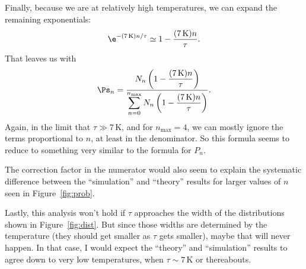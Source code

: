 \documentclass[11pt]{article}
\begin{document}
Finally, because we are at relatively high temperatures, we can expand the remaining exponentials:
\begin{equation}
\e^{-(7\,\text{K})n/\tau}\simeq 1-\frac{(7\,\text{K})n}{\tau}.
\end{equation}
That leaves us with
\begin{equation}
\Ps_n=\frac{\displaystyle N_n\left(1-\frac{(7\,\text{K})n}{\tau}\right)}
	{\displaystyle\sum_{n=0}^{n_\text{max}} N_n\left(1-\frac{(7\,\text{K})n}{\tau}\right)}.
\end{equation}
Again, in the limit that $\tau\gg 7\,\text{K}$, and for $n_\text{max}=4$, we can mostly ignore the terms proportional to $n$, at least in the denominator. So this formula seems to reduce to something very similar to the formula for $P_n$.

The correction factor in the numerator would also seem to explain the systematic difference between the ``simulation'' and ``theory'' results for larger values of $n$ seen in Figure~\ref{fig:prob}.

Lastly, this analysis won't hold if $\tau$ approaches the width of the distributions shown in Figure~\ref{fig:dist}. But since those widths are determined by the temperature (they should get smaller as $\tau$ gets smaller), maybe that will never happen. In that case, I would expect the ``theory'' and ``simulation'' results to agree down to very low temperatures, when $\tau\sim7\,\text{K}$ or thereabouts.
\end{document}
